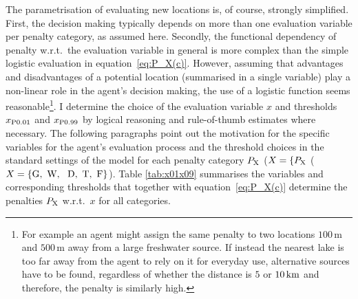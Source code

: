 The parametrisation of evaluating new locations is, of course, strongly simplified.
First, the decision making typically depends on more than one evaluation variable per penalty category, as assumed here.
Secondly, the functional dependency of penalty w.r.t.\ the evaluation variable in general is more complex than the simple logistic evaluation in equation~\ref{eq:P_X(c)}.
However, assuming that advantages and disadvantages of a potential location (summarised in a single variable) play a non-linear role in the agent's decision making, the use of a logistic function seems reasonable\footnote{For example an agent might assign the same penalty to two locations $100\, \text{m}$ and $500\, \text{m}$ away from a large freshwater source. 
If instead the nearest lake is too far away from the agent to rely on it for everyday use, alternative sources have to be found, regardless of whether the distance is $5$ or $10\, {\rm km}$ and therefore, the penalty is similarly high.}.
I determine the choice of the evaluation variable $x$ and thresholds $x_{\rm P0.01}$ and $x_{\rm P0.99}$ by logical reasoning and rule-of-thumb estimates where necessary.
The following paragraphs point out the motivation for the specific variables for the agent's evaluation process and the threshold choices in the standard settings of the model for each penalty category $P_{\rm X}$ ($X=\{P_{\rm X}$ ($X=\{\text{G,\, W, \, D,\, T,\, F}\}$).
Table \ref{tab:x01x09} summarises the variables and corresponding thresholds that together with equation~\ref{eq:P_X(c)} determine the penalties $P_{\rm X}$ w.r.t.\ $x$ for all categories.


